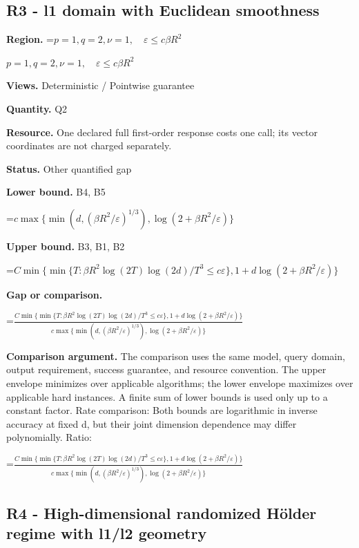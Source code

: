\documentclass[10pt,a4paper]{article}
\newcommand{\AtlasMath}[1]{\par\begingroup\centering\setbox0=\hbox{$\displaystyle #1$}\ifdim\wd0>1.4\linewidth\typeout{ATLAS WIDE FORMULA: \the\wd0}\fi\ifdim\wd0>\linewidth\resizebox{\linewidth}{!}{\box0}\else\box0\fi\par\endgroup}
\newcommand{\AtlasInlineMath}[1]{\begingroup\setbox0=\hbox{$#1$}\ifdim\wd0>.4\linewidth\endgroup\AtlasMath{#1}\else\endgroup$#1$\fi}
\begin{document}
\subsection{R3 - l1 domain with Euclidean smoothness}


\textbf{Region.} \AtlasInlineMath{p=1,q=2,\nu=1,\quad\varepsilon\le c\beta R^2}



\textbf{Views.} Deterministic / Pointwise guarantee



\textbf{Quantity.} Q2



\textbf{Resource.} One declared full first-order response costs one call; its vector coordinates are not charged separately.



\textbf{Status.} Other quantified gap



\textbf{Lower bound.} B4, B5



\AtlasMath{c\max\{\min(d,(\beta R^2/\varepsilon)^{1/3}),\log(2+\beta R^2/\varepsilon)\}}


\textbf{Upper bound.} B3, B1, B2



\AtlasMath{C\min\{\min\{T:\beta R^2\log(2T)\log(2d)/T^3\le c\varepsilon\},1+d\log(2+\beta R^2/\varepsilon)\}}


\textbf{Gap or comparison.}
\AtlasMath{\frac{C\min\{\min\{T:\beta R^2\log(2T)\log(2d)/T^3\le c\varepsilon\},1+d\log(2+\beta R^2/\varepsilon)\}}{c\max\{\min(d,(\beta R^2/\varepsilon)^{1/3}),\log(2+\beta R^2/\varepsilon)\}}}




\textbf{Comparison argument.} The comparison uses the same model, query domain, output requirement, success guarantee, and resource convention. The upper envelope minimizes over applicable algorithms; the lower envelope maximizes over applicable hard instances. A finite sum of lower bounds is used only up to a constant factor. Rate comparison: Both bounds are logarithmic in inverse accuracy at fixed d, but their joint dimension dependence may differ polynomially. Ratio:
\AtlasMath{\frac{C\min\{\min\{T:\beta R^2\log(2T)\log(2d)/T^3\le c\varepsilon\},1+d\log(2+\beta R^2/\varepsilon)\}}{c\max\{\min(d,(\beta R^2/\varepsilon)^{1/3}),\log(2+\beta R^2/\varepsilon)\}}}




\subsection{R4 - High-dimensional randomized Hölder regime with l1/l2 geometry}
\end{document}

